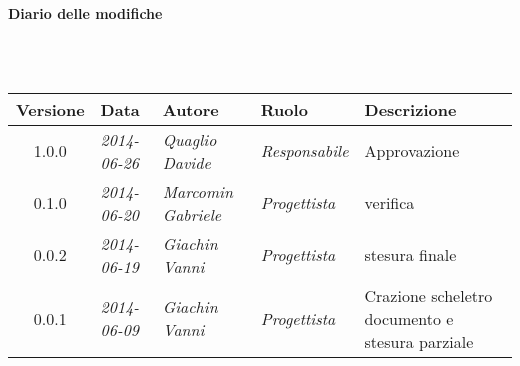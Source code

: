 \noindent\begin{Large}\textbf{Diario delle modifiche}\end{Large}\\
\\
\begin{small}
\begin{tabular}{|c|p{1.8cm}|p{2.8cm}|p{2.8cm}|p{3.5cm}|}
\hline
Versione & Data & Autore & Ruolo & Descrizione \\
\hline
\hline
1.0.0 & \textit{2014-06-26} & \textit{Quaglio Davide} & \textit{Responsabile} & Approvazione\\
0.1.0 & \textit{2014-06-20} & \textit{Marcomin Gabriele} & \textit{Progettista} & verifica\\
0.0.2 & \textit{2014-06-19} & \textit{Giachin Vanni} & \textit{Progettista} & stesura finale\\
0.0.1 & \textit{2014-06-09} & \textit{Giachin Vanni} & \textit{Progettista} & Crazione scheletro documento e stesura parziale\\
\hline
\end{tabular}\\
\end{small}